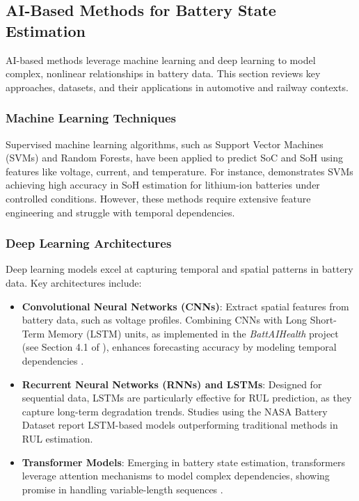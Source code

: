 \subsection{AI-Based Methods for Battery State Estimation}
AI-based methods leverage machine learning and deep learning to model complex, nonlinear relationships in battery data. This section reviews key approaches, datasets, and their applications in automotive and railway contexts.

\subsubsection{Machine Learning Techniques}
Supervised machine learning algorithms, such as Support Vector Machines (SVMs) and Random Forests, have been applied to predict SoC and SoH using features like voltage, current, and temperature. For instance, \cite{Ref5} demonstrates SVMs achieving high accuracy in SoH estimation for lithium-ion batteries under controlled conditions. However, these methods require extensive feature engineering and struggle with temporal dependencies.

\subsubsection{Deep Learning Architectures}
Deep learning models excel at capturing temporal and spatial patterns in battery data. Key architectures include:
\begin{itemize}
    \item \textbf{Convolutional Neural Networks (CNNs)}: Extract spatial features from battery data, such as voltage profiles. Combining CNNs with Long Short-Term Memory (LSTM) units, as implemented in the \textit{BattAIHealth} project (see Section 4.1 of \cite{Report}), enhances forecasting accuracy by modeling temporal dependencies \cite{Ref4}.
    \item \textbf{Recurrent Neural Networks (RNNs) and LSTMs}: Designed for sequential data, LSTMs are particularly effective for RUL prediction, as they capture long-term degradation trends. Studies using the NASA Battery Dataset \cite{Ref1} report LSTM-based models outperforming traditional methods in RUL estimation.
    \item \textbf{Transformer Models}: Emerging in battery state estimation, transformers leverage attention mechanisms to model complex dependencies, showing promise in handling variable-length sequences \cite{Ref5}.
\end{itemize}

